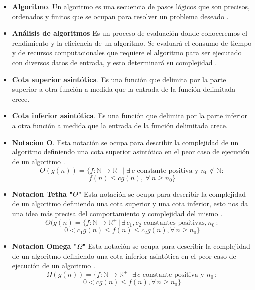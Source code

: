 \documentclass[12pt,twoside]{article}
\begin{document}
\begin{itemize}
\item \textbf{Algoritmo}. Un algoritmo es una secuencia de pasos lógicos que son precisos, ordenados y finitos que se ocupan para resolver un problema deseado \cite{concep1}.

\item \textbf{Análisis de  algoritmos}
Es un proceso de evaluación donde conoceremos el rendimiento y la eficiencia de un algoritmo. Se evaluará el consumo de tiempo y de recursos computacionales que requiere el algoritmo para ser ejecutado con diversos datos de entrada, y esto determinará su complejidad \cite{concep1}.

\item \textbf{Cota superior asintótica}. Es una función que delimita por la parte superior a otra función a medida que la entrada de la función delimitada crece.

\item \textbf{Cota inferior asintótica}. Es una función que delimita por la parte inferior a otra función a medida que la entrada de la función delimitada crece.

\item \textbf{Notacion O}. Esta notación se ocupa para describir la complejidad de un algoritmo definiendo una cota superior asintótica en el peor caso de ejecución de un algoritmo \cite{concep1}.
\\
\[O(g(n)) = \{ f : \mathbb{N} \rightarrow \mathbb{R}^+ \ | \ \exists \ c \text{ constante positiva y } n_0 \notin \mathbb{N} :\] 
\[f(n) \leq cg(n), \ \forall \ n \geq n_0 \}\]

\item \textbf{Notacion Tetha "$\Theta$"} Esta notación se ocupa para describir la complejidad de un algoritmo definiendo una cota superior y una cota inferior, esto nos da una idea más precisa del comportamiento y complejidad del mismo \cite{concep1}.
\\
\[\Theta(g(n) = \{f : \mathbb{N} \rightarrow \mathbb{R}^+ \,|\, \exists \, c_1, c_2 \text{ constantes positivas}, n_0 \,: \]
\[0 < c_1g(n) \leq f(n) \leq c_2g(n), \forall \, n \geq n_0\}\]

\item \textbf{Notacion Omega "$\Omega$"}  Esta notación se ocupa para describir la complejidad de un algoritmo definiendo una cota inferior asintótica en el peor caso de ejecución de un algoritmo \cite{concep1}.
\\
\[\Omega(g(n)) = \{f : \mathbb{N} \rightarrow \mathbb{R}^+ \,|\, \exists \, c \text{ constante positiva y } n_0 \,:\]
\[0 < cg(n) \leq f(n), \forall \, n \geq n_0\}\]



\end{itemize}
\end{document}
